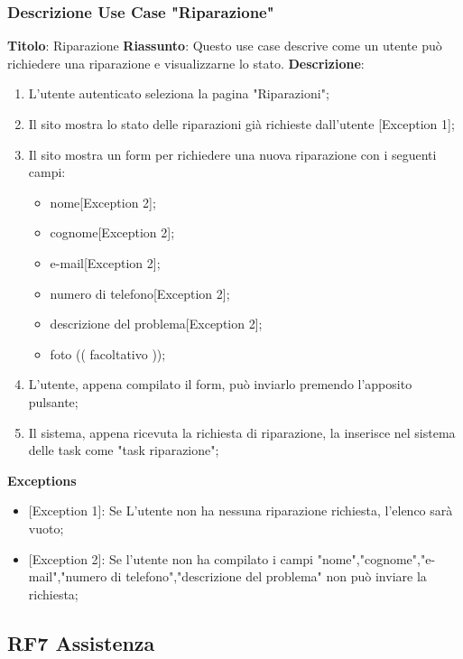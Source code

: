 \documentclass{report}
\begin{document}
\subsubsection*{Descrizione Use Case "Riparazione"}
\textbf{Titolo}: Riparazione \newline
\textbf{Riassunto}: Questo use case descrive come un utente può richiedere una riparazione e visualizzarne lo stato. \newline
\textbf{Descrizione}:
	\begin{enumerate}
		\item L'utente autenticato seleziona la pagina "Riparazioni";
		\item Il sito mostra lo stato delle riparazioni già richieste dall'utente [Exception 1];
		\item Il sito mostra un form per richiedere una nuova riparazione con i seguenti campi:
		\begin{itemize}
			\item nome[Exception 2];
			\item cognome[Exception 2]; 
			\item e-mail[Exception 2];
			\item numero di telefono[Exception 2];
			\item descrizione del problema[Exception 2];
			\item foto (( facoltativo ));
		\end{itemize}
		\item L'utente, appena compilato il form, può inviarlo premendo l'apposito pulsante;
		\item Il sistema, appena ricevuta la richiesta di riparazione, la inserisce nel sistema delle task come "task riparazione";
		
	\end{enumerate}
\textbf{Exceptions}
\begin{itemize}
	\item {[Exception 1]}: Se L'utente non ha nessuna riparazione richiesta, l'elenco sarà vuoto;
	\item {[Exception 2]}: Se l'utente non ha compilato i campi "nome","cognome","e-mail","numero di telefono","descrizione del problema" non può inviare la richiesta;
\end{itemize}
\subsection*{RF7 Assistenza}
\end{document}
